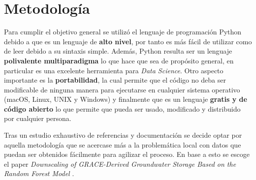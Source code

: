 \chapter{Metodología}
\label{C3}
Para cumplir el objetivo general se utilizó el lenguaje de programación Python debido a que es un lenguaje de \textbf{alto nivel}, por tanto es más fácil de utilizar como de leer debido a su sintaxis simple.
Además, Python resulta ser un lenguaje \textbf{polivalente multiparadigma} lo que hace que sea de propósito general, en particular es una excelente herramienta para \textit{Data Science}. Otro aspecto importante es la
\textbf{portabilidad}, la cual permite que el código no deba ser modificable de ninguna manera para ejecutarse en cualquier sistema operativo (macOS, Linux, UNIX y Windows) y finalmente que es un lenguaje
\textbf{gratis y de código abierto} lo que permite que pueda ser usado, modificado y distribuido por cualquier persona.

Tras un estudio exhaustivo de referencias y documentación se decide optar por aquella metodología
que se acercase más a la problemática local con datos que puedan ser obtenidos fácilmente para agilizar
el proceso. En base a esto se escoge el paper \textit{Downscaling of GRACE-Derived Groundwater Storage
Based on the Random Forest Model} \cite{11}. 

